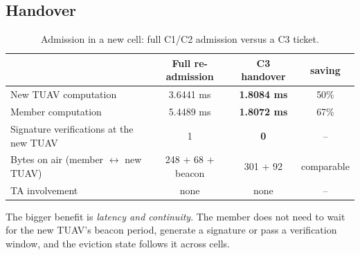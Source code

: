 \subsection{Handover}
\begin{table}[H]
\centering\small
\caption{Admission in a new cell: full C1/C2 admission versus a C3 ticket.}
\label{tab:ho}
\begin{tabular}{@{}lccc@{}}
\toprule
 & Full re-admission & \textbf{C3 handover} & saving\\
\midrule
New TUAV computation & 3.6441 ms & \textbf{1.8084 ms} & 50\%\\
Member computation & 5.4489 ms & \textbf{1.8072 ms} & 67\%\\
Signature verifications at the new TUAV & 1 & \textbf{0} & --\\
Bytes on air (member $\leftrightarrow$ new TUAV) & 248 + 68 + beacon & 301 + 92 & comparable\\
TA involvement & none & none & --\\
\bottomrule
\end{tabular}
\end{table}
\noindent The bigger benefit is \emph{latency and continuity}. The member does not need to wait for the new TUAV's beacon period, generate a signature or pass a
verification window, and the eviction state follows it across cells.
